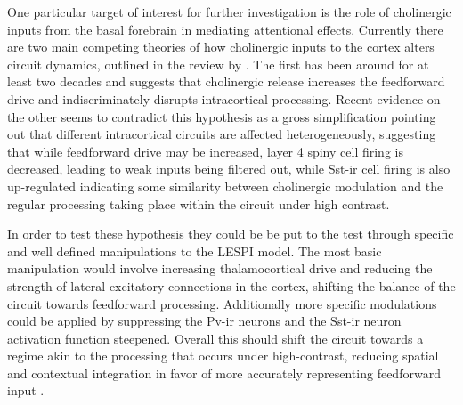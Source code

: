 One particular target of interest for further investigation is the
role of cholinergic inputs from the basal forebrain in mediating
attentional effects. Currently there are two main competing theories
of how cholinergic inputs to the cortex alters circuit dynamics,
outlined in the review by \cite{Thiele2013}. The first has been around
for at least two decades and suggests that cholinergic release
increases the feedforward drive and indiscriminately disrupts
intracortical processing. Recent evidence on the other seems to
contradict this hypothesis as a gross simplification pointing out that
different intracortical circuits are affected heterogeneously,
suggesting that while feedforward drive may be increased, layer 4
spiny cell firing is decreased, leading to weak inputs being filtered
out, while Sst-ir cell firing is also up-regulated indicating some
similarity between cholinergic modulation and the regular processing
taking place within the circuit under high contrast.

In order to test these hypothesis they could be be put to the test
through specific and well defined manipulations to the LESPI
model. The most basic manipulation would involve increasing
thalamocortical drive and reducing the strength of lateral excitatory
connections in the cortex, shifting the balance of the circuit towards
feedforward processing. Additionally more specific modulations could
be applied by suppressing the Pv-ir neurons and the Sst-ir neuron
activation function steepened. Overall this should shift the circuit
towards a regime akin to the processing that occurs under
high-contrast, reducing spatial and contextual integration in favor of
more accurately representing feedforward input \citep{Roberts2005,
  Roberts2008a, Roberts2008b}.
